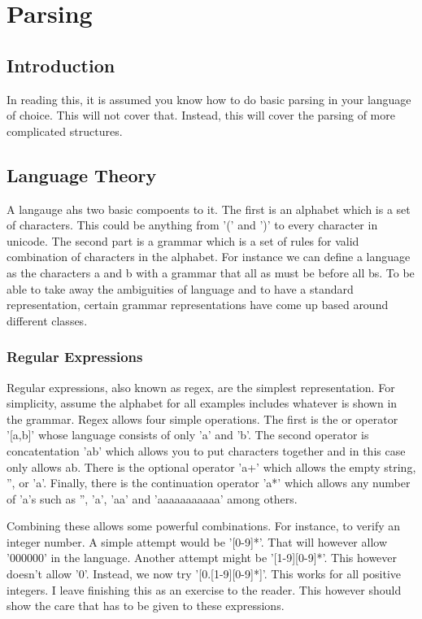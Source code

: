 \chapter{Parsing}
\label{Chapter:Parsing}

\section{Introduction}

In reading this, it is assumed you know how to do basic parsing in
your language of choice. This will not cover that. Instead, this will
cover the parsing of more complicated structures. %

\section{Language Theory}

A langauge ahs two basic compoents to it. The first is an alphabet
which is a set of characters. This could be anything from '(' and ')'
to every character in unicode. The second part is a grammar which is a
set of rules for valid combination of characters in the alphabet. For
instance we can define a language as the characters a and b with a
grammar that all as must be before all bs. To be able to take away the
ambiguities of language and to have a standard representation, certain
grammar representations have come up based around different classes.

\subsection{Regular Expressions}

Regular expressions, also known as regex, are the simplest
representation. For simplicity, assume the alphabet for all examples
includes whatever is shown in the grammar. Regex allows four simple
operations. The first is the or operator '[a,b]' whose language consists
of only 'a' and 'b'. The second operator is concatentation 'ab' which
allows you to put characters together and in this case only allows
ab. There is the optional operator 'a+' which allows the empty string, '',
or 'a'. Finally, there is the continuation operator 'a*' which allows
any number of 'a's such as '', 'a', 'aa' and 'aaaaaaaaaaa' among
others.

Combining these allows some powerful combinations. For instance, to
verify an integer number. A simple attempt would be '[0-9]*'. That
will however allow '000000' in the language. Another attempt might be
'[1-9][0-9]*'.  This however doesn't allow '0'. Instead, we now try
'[0.[1-9][0-9]*]'. This works for all positive integers. I leave
finishing this as an exercise to the reader. This however should show
the care that has to be given to these expressions.

